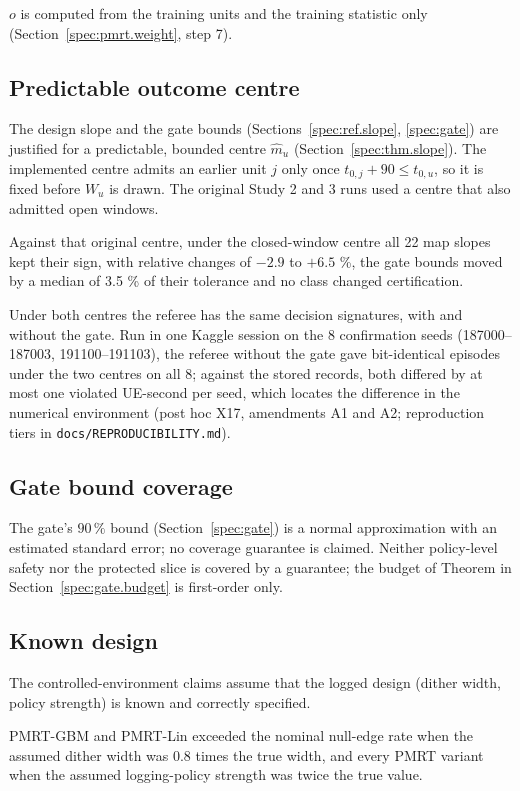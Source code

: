\noindent $o$ is computed from the training units and the training statistic only (Section~\ref{spec:pmrt.weight}, step 7).


\subsection{Predictable outcome centre}
\label{spec:asm.centre}

The design slope and the gate bounds (Sections~\ref{spec:ref.slope}, \ref{spec:gate}) are justified for a predictable, bounded centre $\hat m_u$ (Section~\ref{spec:thm.slope}). The implemented centre admits an earlier unit $j$ only once $t_{0,j} + 90 \le t_{0,u}$, so it is fixed before $W_u$ is drawn. The original Study 2 and 3 runs used a centre that also admitted open windows.

Against that original centre, under the closed-window centre all 22 map slopes kept their sign, with relative changes of $-2.9$ to $+6.5$ \%, the gate bounds moved by a median of 3.5 \% of their tolerance and no class changed certification.

Under both centres the referee has the same decision signatures, with and without the gate. Run in one Kaggle session on the 8 confirmation seeds (187000--187003, 191100--191103), the referee without the gate gave bit-identical episodes under the two centres on all 8; against the stored records, both differed by at most one violated UE-second per seed, which locates the difference in the numerical environment (post hoc X17, amendments A1 and A2; reproduction tiers in \texttt{docs/REPRODUCIBILITY.md}).

\subsection{Gate bound coverage}
\label{spec:asm.gatecov}

The gate's $90\,\%$ bound (Section~\ref{spec:gate}) is a normal approximation with an estimated standard error; no coverage guarantee is claimed. Neither policy-level safety nor the protected slice is covered by a guarantee; the budget of Theorem in Section~\ref{spec:gate.budget} is first-order only.


\subsection{Known design}
\label{spec:asm.known}

The controlled-environment claims assume that the logged design (dither width, policy strength) is known and correctly specified.

PMRT-GBM and PMRT-Lin exceeded the nominal null-edge rate when the assumed dither width was 0.8 times the true width, and every PMRT variant when the assumed logging-policy strength was twice the true value.
